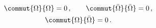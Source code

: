 \begin{equation}
  \begin{gathered}
\label{eq:nilpotency}
\commut{\Omega}{\Omega}=0\,,\qquad
\commut{\bar\Omega}{\bar\Omega}=0\,,\\
\commut{\Omega}{\bar\Omega}=0\,.
  \end{gathered}
\end{equation}

